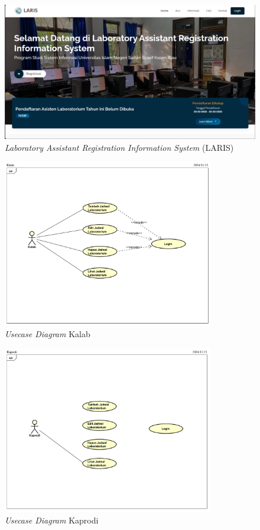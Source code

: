 \begin{figure}[h]
	\centering
	\includegraphics[width=0.82\linewidth]{konten//gambar/laris.png}
	\caption{\textit{Laboratory Assistant Registration Information System} (LARIS) \protect\cite{web-prodi}}
	\label{fig:laris-bab2}
\end{figure}


\begin{figure}
	\centering
	\includegraphics[width=0.82\textwidth]{konten/gambar/usecase-diagram/kalab.png}
	\caption{\textit{Usecase Diagram} Kalab}
	\label{usecase-diagram-kalab}
\end{figure}

\begin{figure}
	\centering
	\includegraphics[width=0.82\textwidth]{konten/gambar/usecase-diagram/kaprodi.png}
	\caption{\textit{Usecase Diagram} Kaprodi}
	\label{usecase-diagram-kaprodi}
\end{figure}

